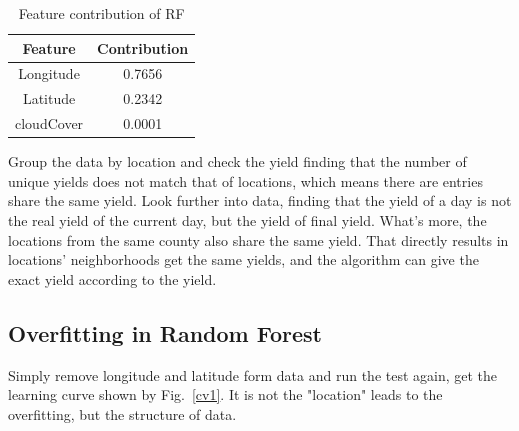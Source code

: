 \documentclass[conference]{IEEEtran}
\begin{document}
\begin{table}[htbp]
    \caption{Feature contribution of RF}
    \begin{center}
    \begin{tabular}{|c|c|}
    \hline
      Feature & Contribution \\
    \hline
      Longitude & 0.7656 \\
      Latitude & 0.2342 \\
      cloudCover & 0.0001 \\
    \hline
    \end{tabular}
    \label{tab:RF_contribution}
    \end{center}
\end{table}

  Group the data by location and check the yield finding that the number of unique yields does not match that of locations, which means there are entries share the same yield. Look further into data, finding that the yield of a day is not the real yield of the current day, but the yield of final yield. What's more, the locations from the same county also share the same yield. That directly results in locations' neighborhoods get the same yields, and the algorithm can give the exact yield according to the yield.  

\subsection{Overfitting in Random Forest}
  Simply remove longitude and latitude form data and run the test again, get the learning curve shown by Fig.~\ref{cv1}. It is not the "location" leads to the overfitting, but the structure of data.
\end{document}
